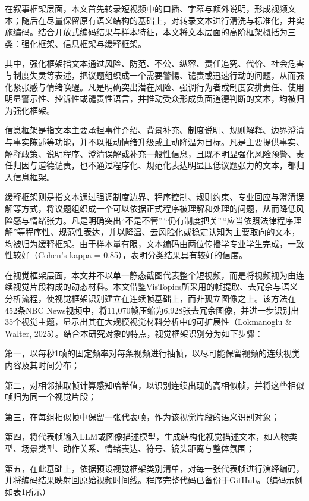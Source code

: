 \documentclass[
]{article}
\begin{document}
在叙事框架层面，本文首先转录短视频中的口播、字幕与额外说明，形成视频文本；随后在尽量保留原有语义结构的基础上，对转录文本进行清洗与标准化，并实施编码。结合开放式编码结果与样本特征，本文将文本层面的高阶框架概括为三类：强化框架、信息框架与缓释框架。

其中，强化框架指文本通过风险、防范、不公、纵容、责任追究、代价、社会危害与制度失灵等表述，把议题组织成一个需要警惕、谴责或迅速行动的问题，从而强化紧张感与情绪唤醒。凡是明确突出潜在风险、强调行为者或制度安排责任、使用明显警示性、控诉性或谴责性语言，并推动受众形成负面道德判断的文本，均被归为强化框架。

信息框架是指文本主要承担事件介绍、背景补充、制度说明、规则解释、边界澄清与事实陈述等功能，并不以推动情绪升级或主动降温为目标。凡是主要提供事实、解释政策、说明程序、澄清误解或补充一般性信息，且既不明显强化风险预警、责任归因与道德谴责，也不通过程序化、规范化表达明显压低议题张力的文本，都归入信息框架。

缓释框架则是指文本通过强调制度边界、程序控制、规则约束、专业回应与澄清误解等方式，将议题组织成一个可以依据正式程序被理解和处理的问题，从而降低风险感与情绪张力。凡是明确突出``不是不管''\,``仍有制度把关''\,``应当依照法律程序理解''等程序性、规范性表达，并以降温、去风险化或稳定认知为主要取向的文本，均被归为缓释框架。由于样本量有限，文本编码由两位传播学专业学生完成，一致性较好（Cohen's
kappa = 0.85），表明分类结果具有较好的信度。

在视觉框架层面，本文并不以单一静态截图代表整个短视频，而是将视频视为由连续视觉片段构成的动态材料。本文借鉴VisTopics所采用的帧提取、去冗余与语义分析流程，使视觉框架识别建立在连续帧基础上，而非孤立图像之上。该方法在452条NBC
News视频中，将11,070帧压缩为6,928张去冗余图像，并进一步识别出35个视觉主题，显示出其在大规模视觉材料分析中的可扩展性（Lokmanoglu
\& Walter, 2025）。结合本研究对象的特点，视觉框架识别分为如下步骤：

第一，以每秒1帧的固定频率对每条视频进行抽帧，以尽可能保留视频的连续视觉内容及其时间分布；

第二，对相邻抽取帧计算感知哈希值，以识别连续出现的高相似帧，并将这些相似帧归为同一个视觉片段；

第三，在每组相似帧中保留一张代表帧，作为该视觉片段的语义识别对象；

第四，将代表帧输入LLM或图像描述模型，生成结构化视觉描述文本，如人物类型、场景类型、动作关系、情绪表达、符号、镜头距离与整体氛围；

第五，在此基础上，依据预设视觉框架类别清单，对每一张代表帧进行演绎编码，并将编码结果映射回原始视频时间线。程序完整代码已备份于GitHub。（编码示例如表1所示）
\end{document}
